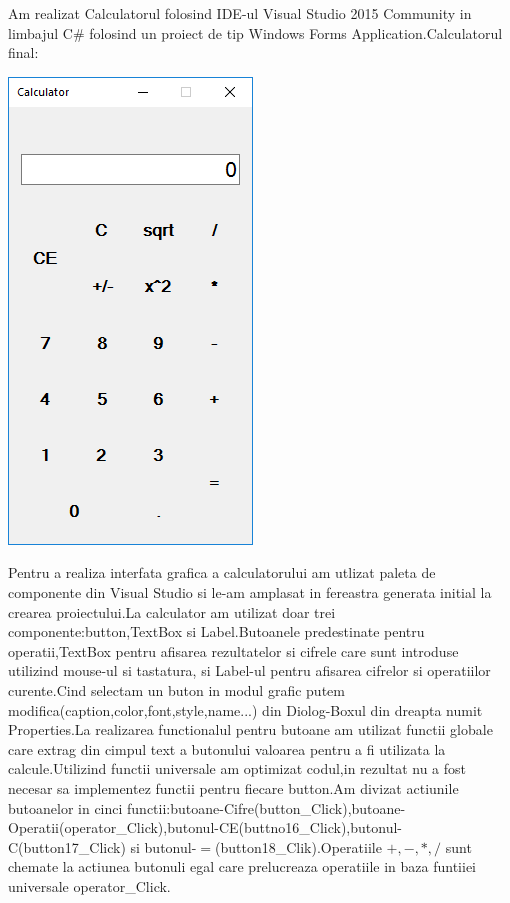 Am realizat Calculatorul folosind IDE-ul Visual Studio 2015 Community in limbajul \textsc{\large C\#} folosind un proiect de tip Windows Forms Application.Calculatorul final:\\
\begin{center}
\includegraphics[scale=1]{images/1}
\end{center}
Pentru a realiza interfata grafica a calculatorului am utlizat paleta de componente din Visual Studio si le-am amplasat in fereastra generata initial la crearea proiectului.La calculator am utilizat doar trei componente:button,TextBox si Label.Butoanele predestinate pentru operatii,TextBox pentru afisarea rezultatelor si cifrele care sunt introduse utilizind mouse-ul si tastatura, si Label-ul pentru afisarea cifrelor si operatiilor curente.Cind selectam un buton in modul grafic putem modifica(caption,color,font,style,name...) din Diolog-Boxul din dreapta numit Properties.La realizarea functionalul pentru butoane am utilizat functii globale care extrag din cimpul text a butonului valoarea pentru a fi utilizata la calcule.Utilizind functii universale am optimizat codul,in rezultat nu a fost necesar sa implementez functii pentru fiecare button.Am divizat actiunile butoanelor in cinci functii:butoane-Cifre(button\_Click),butoane-Operatii(operator\_Click),butonul-CE(buttno16\_Click),butonul-C(button17\_Click) si butonul-$=$(button18\_Clik).Operatiile 
$+,-,*,/$ sunt chemate la actiunea butonuli egal care prelucreaza operatiile in baza funtiiei universale operator\_Click.

